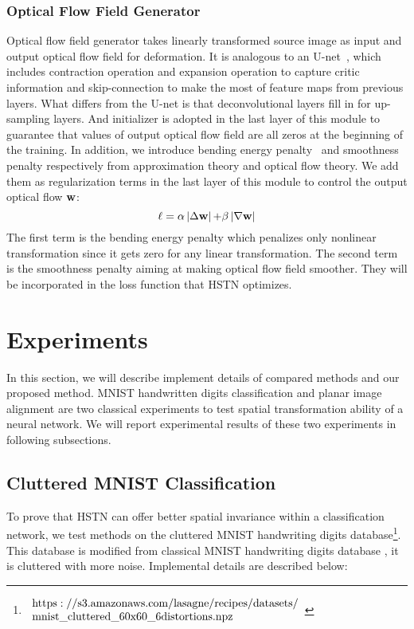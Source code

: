 \documentclass{article}
\begin{document}
\subsubsection{Optical Flow Field Generator}
Optical flow field generator takes linearly transformed source image as input and output optical flow field for deformation.
It is analogous to an U-net~\cite{ronneberger2015u}, which includes contraction operation and expansion operation to capture critic information and skip-connection to make the most of feature maps from previous layers.
What differs from the U-net is that deconvolutional layers fill in for up-sampling layers.
And initializer is adopted in the last layer of this module to guarantee that values of output optical flow field are all zeros at the beginning of the training.
In addition, we introduce bending energy penalty~\cite{Galway1990Spline} and smoothness penalty respectively from approximation theory and optical flow theory. We add them as regularization terms in the last layer of this module to control the output optical flow $\bf{w}$:
\begin{equation}\label{7}
\ell  = \alpha \left| {\Delta {\bf{w}}} \right|{\rm{ + }}\beta \left| {\nabla {\bf{w}}} \right|
\end{equation}
The first term is the bending energy penalty which penalizes only nonlinear transformation since it gets zero for any linear transformation.
The second term is the smoothness penalty aiming at making optical flow field smoother.
They will be incorporated in the loss function that HSTN optimizes.

\section{Experiments}
In this section, we will describe implement details of compared methods and our proposed method.
MNIST handwritten digits classification and planar image alignment are two classical experiments to test spatial transformation ability of a neural network.
We will report experimental results of these two experiments in following subsections.

\subsection{Cluttered MNIST Classification}
To prove that HSTN can offer better spatial invariance within a classification network, we test methods on the cluttered MNIST handwriting digits database\footnote{$\begin{array}{l}
{\rm{https://s3}}{\rm{.amazonaws}}{\rm{.com/lasagne/recipes/datasets/}}\\
{\rm{mnist\_cluttered\_60x60\_6distortions}}{\rm{.npz}}
\end{array}$}.
This database is modified from classical MNIST handwriting digits database \cite{Lecun2010The}, it is cluttered with more noise.
Implemental details are described below:
\end{document}
